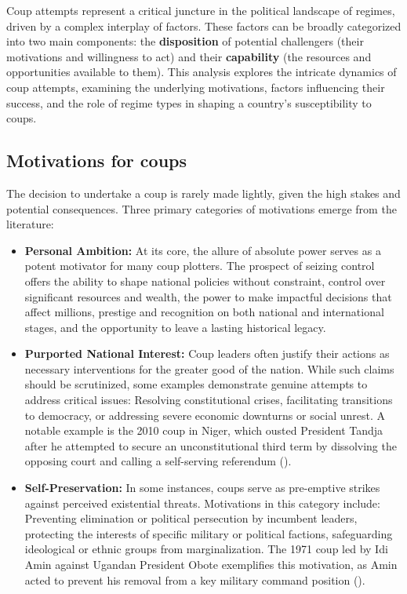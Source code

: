 \documentclass[
  12pt,
]{report}
\begin{document}
Coup attempts represent a critical juncture in the political landscape
of regimes, driven by a complex interplay of factors. These factors can
be broadly categorized into two main components: the
\textbf{disposition} of potential challengers (their motivations and
willingness to act) and their \textbf{capability} (the resources and
opportunities available to them). This analysis explores the intricate
dynamics of coup attempts, examining the underlying motivations, factors
influencing their success, and the role of regime types in shaping a
country's susceptibility to coups.

\subsection{Motivations for coups}\label{motivations-for-coups}

The decision to undertake a coup is rarely made lightly, given the high
stakes and potential consequences. Three primary categories of
motivations emerge from the literature:

\begin{itemize}
\item
  \textbf{Personal Ambition:} At its core, the allure of absolute power
  serves as a potent motivator for many coup plotters. The prospect of
  seizing control offers the ability to shape national policies without
  constraint, control over significant resources and wealth, the power
  to make impactful decisions that affect millions, prestige and
  recognition on both national and international stages, and the
  opportunity to leave a lasting historical legacy.
\item
  \textbf{Purported National Interest:} Coup leaders often justify their
  actions as necessary interventions for the greater good of the nation.
  While such claims should be scrutinized, some examples demonstrate
  genuine attempts to address critical issues: Resolving constitutional
  crises, facilitating transitions to democracy, or addressing severe
  economic downturns or social unrest. A notable example is the 2010
  coup in Niger, which ousted President Tandja after he attempted to
  secure an unconstitutional third term by dissolving the opposing court
  and calling a self-serving referendum
  ().
\item
  \textbf{Self-Preservation:} In some instances, coups serve as
  pre-emptive strikes against perceived existential threats. Motivations
  in this category include: Preventing elimination or political
  persecution by incumbent leaders, protecting the interests of specific
  military or political factions, safeguarding ideological or ethnic
  groups from marginalization. The 1971 coup led by Idi Amin against
  Ugandan President Obote exemplifies this motivation, as Amin acted to
  prevent his removal from a key military command position
  ().
\end{itemize}
\end{document}
